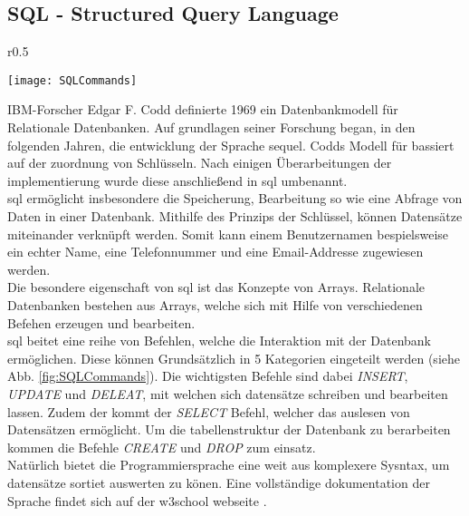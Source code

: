 \subsection{SQL - Structured Query Language}
\begin{wrapfigure}{r}{0.5\textwidth}
    \vspace{-1.2cm}
    \begin{center}
      \texttt{[image: SQLCommands]}
    \end{center}
    \vspace{-0.5cm}
    \caption{SQL Befehls Kategorien \cite{SQLCommands}}
    \label{fig:SQLCommands}
    \vspace{-0.5cm}
  \end{wrapfigure}
IBM-Forscher Edgar F. Codd definierte 1969 ein Datenbankmodell für Relationale Datenbanken. Auf grundlagen seiner Forschung began, in den folgenden Jahren, die entwicklung der Sprache \ac{sequel}. Codds Modell für bassiert auf der zuordnung von Schlüsseln. Nach einigen Überarbeitungen der implementierung wurde diese anschließend in \ac{sql} umbenannt.\\
\ac{sql} ermöglicht insbesondere die Speicherung, Bearbeitung so wie eine Abfrage von Daten in einer Datenbank. Mithilfe des Prinzips der Schlüssel, können Datensätze miteinander verknüpft werden. Somit kann einem Benutzernamen bespielsweise ein echter Name, eine Telefonnummer und eine Email-Addresse zugewiesen werden.\\
Die besondere eigenschaft von \ac{sql} ist das Konzepte von Arrays. Relationale Datenbanken bestehen aus Arrays, welche sich mit Hilfe von verschiedenen Befehen erzeugen und bearbeiten. \cite{SQL}\\
\ac{sql} beitet eine reihe von Befehlen, welche die Interaktion mit der Datenbank ermöglichen. Diese können Grundsätzlich in 5 Kategorien eingeteilt werden (siehe Abb. \ref{fig:SQLCommands}). Die wichtigsten Befehle sind dabei \textit{INSERT}, \textit{UPDATE} und \textit{DELEAT}, mit welchen sich datensätze schreiben und bearbeiten lassen. Zudem der kommt der \textit{SELECT} Befehl, welcher das auslesen von Datensätzen ermöglicht. Um die tabellenstruktur der Datenbank zu berarbeiten kommen die Befehle \textit{CREATE} und \textit{DROP} zum einsatz. \cite{SQLCommands}\\
Natürlich bietet die Programmiersprache eine weit aus komplexere Sysntax, um datensätze sortiet auswerten zu könen. Eine vollständige dokumentation der Sprache findet sich auf der w3school webseite \cite{SQLDoku}.